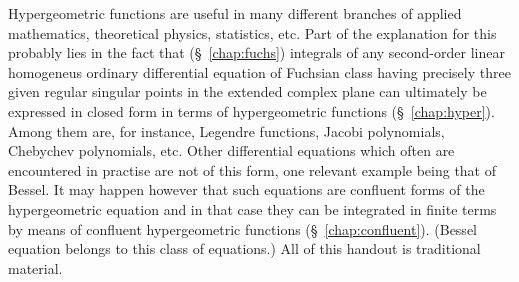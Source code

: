 


Hypergeometric functions  are useful in many different branches of applied
mathematics, theoretical physics, statistics, etc.  Part of the  explanation for
this probably  lies in the fact that (\S~\ref{chap:fuchs}) integrals of any
second-order linear homogeneus ordinary differential equation of Fuchsian class
having precisely three given regular singular points in the extended complex
plane can ultimately be expressed in closed form in terms of hypergeometric
functions  (\S~\ref{chap:hyper}). Among them are, for instance, Legendre
functions, Jacobi polynomials, Chebychev polynomials, etc.  Other differential
equations which often are encountered  in practise  are not of this form, one
relevant example being that of Bessel.  It may happen  however  that such
equations are confluent forms of the hypergeometric equation and in that case
they can be integrated in finite terms by means of confluent hypergeometric
functions (\S~\ref{chap:confluent}). (Bessel equation belongs to this class of
equations.) All of this handout is traditional material. 

\smallskip
 
\noindent\textsw{\myLocation, \myTime}


\begin{flushright}
        \Large{\calligra\myName} 
\end{flushright}

